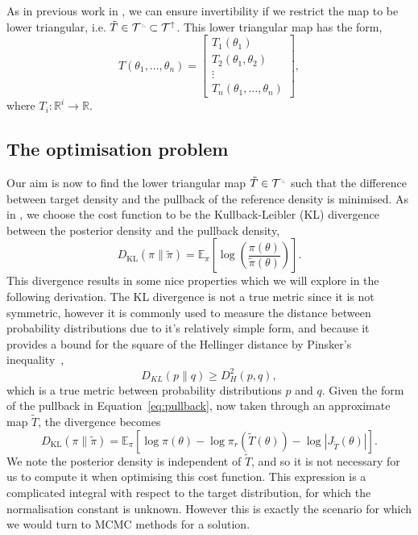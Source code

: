 \documentclass[final]{siamltex}
\newcommand{\ltri}{%
\,\resizebox{!}{0.25\baselineskip}{%
\begin{tikzpicture}%
\draw[line width=1mm](0,0) -- (0,2) -- (2,0)  -- (0,0);
\end{tikzpicture}%
}\xspace%
}%
\begin{document}
As in previous work in \cite{parno2014transport}, we can ensure
invertibility if we restrict the map to be lower triangular, i.e. $\tilde{T} \in \mathcal{T}^{\ltri}\subset\mathcal{T}^\uparrow$. This lower triangular map has the form,
\[
	T(\theta_1, \dots, \theta_n) = \begin{bmatrix} T_1(\theta_1) \\ T_2(\theta_1, \theta_2) \\ \vdots \\
		T_n(\theta_1, \dots, \theta_n) \end{bmatrix},
\]
where $T_i\colon \mathbb{R}^i \to \mathbb{R}$. %

\subsection{The optimisation problem}
Our aim is now to find the lower triangular map $\tilde{T} \in
\mathcal{T}^{\ltri}$ such that the difference between target
density and the pullback of the reference density is minimised. As in
\cite{parno2014transport}, we choose the cost function
to be the Kullback-Leibler (KL) divergence between the posterior density and the pullback density,
\[
	D_\text{KL}(\pi\|\tilde{\pi}) =
		\mathbb{E}_\pi\left[\log\left(\frac{\pi(\theta)}{\tilde{\pi}(\theta)}\right)\right].
\]
This divergence results in some nice properties which we will explore in the following derivation. The KL divergence is not a true metric since it is not symmetric, however it is commonly used to measure the distance between probability distributions due to it's relatively simple form, and because it provides a bound for the square of the Hellinger distance by Pinsker's inequality~\cite{pinsker1960information},
\[
	D_{KL}(p\|q) \geq D_H^2(p,q),
\]
which is a true metric between probability distributions $p$ and $q$.
Given the form of the pullback in Equation~\eqref{eq:pullback}, now taken through an approximate map $\tilde{T}$, the divergence becomes
\[
	D_\text{KL}(\pi\|\tilde{\pi}) = \mathbb{E}_\pi\left[\log\pi(\theta) - \log\pi_r(\tilde{T}(\theta)) -
		\log\left|J_{\tilde{T}}(\theta)\right|\right].
\]
We note the posterior density is independent of $\tilde{T}$, and so it is not necessary for us to compute it when optimising this cost function. This expression is a complicated integral with respect to the target distribution, for which the normalisation constant is unknown. However this is exactly the scenario for which we would turn to MCMC methods for a solution.
\end{document}
